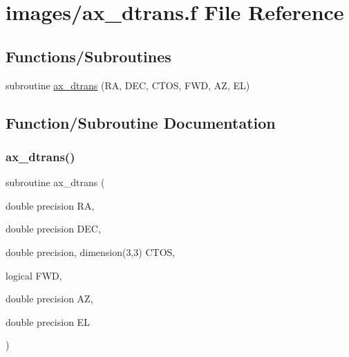 \hypertarget{ax__dtrans_8f}{}\section{images/ax\+\_\+dtrans.f File Reference}
\label{ax__dtrans_8f}
\subsection*{Functions/\+Subroutines}
\begin{DoxyCompactItemize}
\item 
subroutine \hyperlink{ax__dtrans_8f_a306e9cad8f3cc97b21c41f13545d27a5}{ax\+\_\+dtrans} (RA, D\+EC, C\+T\+OS, F\+WD, AZ, EL)
\end{DoxyCompactItemize}


\subsection{Function/\+Subroutine Documentation}
\mbox{\label{ax__dtrans_8f_a306e9cad8f3cc97b21c41f13545d27a5}} 
\subsubsection{\texorpdfstring{ax\+\_\+dtrans()}{ax\_dtrans()}}
{\footnotesize\ttfamily subroutine ax\+\_\+dtrans (\begin{DoxyParamCaption}\item[{double precision}]{RA,  }\item[{double precision}]{D\+EC,  }\item[{double precision, dimension(3,3)}]{C\+T\+OS,  }\item[{logical}]{F\+WD,  }\item[{double precision}]{AZ,  }\item[{double precision}]{EL }\end{DoxyParamCaption})}

